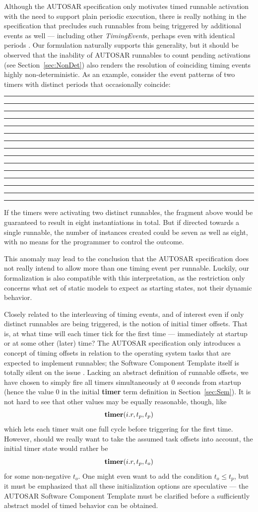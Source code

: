 \documentclass[10pt,conference]{IEEEtran}
\begin{document}
Although the AUTOSAR specification only motivates timed runnable activation with the need to support plain periodic execution, there is really nothing in the specification that precludes such runnables from being triggered by additional events as well --- including other \emph{TimingEvent}s, perhaps even with identical periods \cite[table~7.1, ch.~7.2.3]{AR:SWC}. Our formulation naturally supports this generality, but it should be observed that the inability of AUTOSAR runnables to count pending activations (see Section~\ref{sec:NonDet}) also renders the resolution of coinciding timing events highly non-deterministic. As an example, consider the event patterns of two timers with distinct periods that occasionally coincide:
\begin{center}
\rule{3mm}{1pt}%
						\rule[-9pt]{1mm}{10pt}%
\rule{2mm}{1pt}%
													\rule{1mm}{10pt}%
\rule{7mm}{1pt}%
						\rule[-9pt]{1mm}{10pt}%
\rule{1mm}{1pt}%
													\rule{1mm}{10pt}%
\rule{9mm}{1pt}%
									\rule[-9pt]{1mm}{19pt}%
\rule{9mm}{1pt}%
													\rule{1mm}{10pt}%
\rule{1mm}{1pt}%
						\rule[-9pt]{1mm}{10pt}%
\rule{4mm}{1pt}%
\end{center}
If the timers were activating two distinct runnables, the fragment above would be guaranteed to result in eight instantiations in total. But if directed towards a single runnable, the number of instances created could be seven as well as eight, with no means for the programmer to control the outcome.

This anomaly may lead to the conclusion that the AUTOSAR specification does not really intend to allow more than one timing event per runnable. Luckily, our formalization is also compatible with this interpretation, as the restriction only concerns what set of static models to expect as starting states, not their dynamic behavior.

Closely related to the interleaving of timing events, and of interest even if only distinct runnables are being triggered, is the notion of initial timer offsets. That is, at what time will each timer tick for the first time --- immediately at startup or at some other (later) time? The AUTOSAR specification only introduces a concept of timing offsets in relation to the operating system tasks that are expected to implement runnables; the Software Component Template itself is totally silent on the issue \cite{AR:SWC}. Lacking an abstract definition of runnable offsets, we have chosen to simply fire all timers simultaneously at $0$ seconds from startup (hence the value $0$ in the initial {\bf timer} term definition in Section~\ref{sec:Sem}). It is not hard to see that other values may be equally reasonable, though, like
$$
	\textbf{timer}(i.r,t_p,t_p)
$$
which lets each timer wait one full cycle before triggering for the first time. However, should we really want to take the assumed task offsets into account, the initial timer state would rather be
$$
	\textbf{timer}(i.r,t_p,t_o)
$$
for some non-negative $t_o$. One might even want to add the condition $t_o \leq t_p$, but it must be emphasized that all these initialization options are speculative --- the AUTOSAR Software Component Template must be clarified before a sufficiently abstract model of timed behavior can be obtained.
\end{document}
